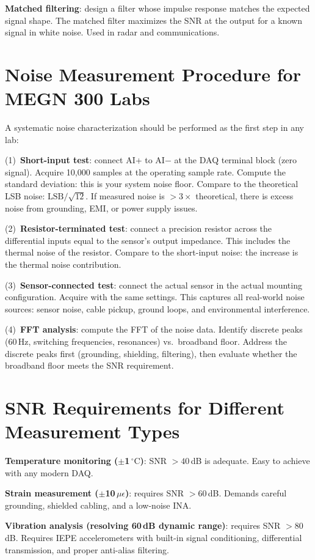 \documentclass[11pt,letterpaper,twoside,openany]{book}
\newcommand{\degC}{\ensuremath{{}^{\circ}\text{C}}}
\begin{document}
\textbf{Matched filtering}: design a filter whose impulse response matches the expected signal shape. The matched filter maximizes the SNR at the output for a known signal in white noise. Used in radar and communications.
\section{Noise Measurement Procedure for MEGN 300 Labs}
A systematic noise characterization should be performed as the first step in any lab:

(1)~\textbf{Short-input test}: connect AI+ to AI$-$ at the DAQ terminal block (zero signal). Acquire 10,000 samples at the operating sample rate. Compute the standard deviation: this is your system noise floor. Compare to the theoretical LSB noise: $\text{LSB}/\sqrt{12}$. If measured noise is $>3\times$ theoretical, there is excess noise from grounding, EMI, or power supply issues.

(2)~\textbf{Resistor-terminated test}: connect a precision resistor across the differential inputs equal to the sensor's output impedance. This includes the thermal noise of the resistor. Compare to the short-input noise: the increase is the thermal noise contribution.

(3)~\textbf{Sensor-connected test}: connect the actual sensor in the actual mounting configuration. Acquire with the same settings. This captures all real-world noise sources: sensor noise, cable pickup, ground loops, and environmental interference.

(4)~\textbf{FFT analysis}: compute the FFT of the noise data. Identify discrete peaks (60\,Hz, switching frequencies, resonances) vs.\ broadband floor. Address the discrete peaks first (grounding, shielding, filtering), then evaluate whether the broadband floor meets the SNR requirement.

\section{SNR Requirements for Different Measurement Types}
\textbf{Temperature monitoring ($\pm$1\,\degC{})}: SNR $> 40$\,dB is adequate. Easy to achieve with any modern DAQ.

\textbf{Strain measurement ($\pm$10\,$\mu\epsilon$)}: requires SNR $> 60$\,dB. Demands careful grounding, shielded cabling, and a low-noise INA.

\textbf{Vibration analysis (resolving 60\,dB dynamic range)}: requires SNR $> 80$\,dB. Requires IEPE accelerometers with built-in signal conditioning, differential transmission, and proper anti-alias filtering.
\end{document}
